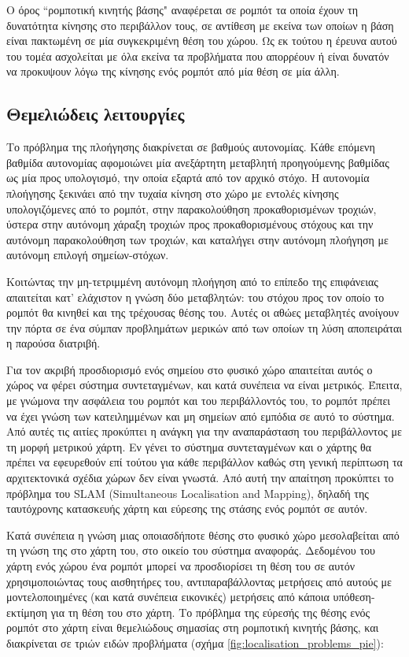 Ο όρος ``ρομποτική κινητής βάσης" αναφέρεται σε ρομπότ τα οποία έχουν τη
δυνατότητα κίνησης στο περιβάλλον τους, σε αντίθεση με εκείνα των οποίων η βάση
είναι πακτωμένη σε μία συγκεκριμένη θέση του χώρου. Ως εκ τούτου η έρευνα αυτού
του τομέα ασχολείται με όλα εκείνα τα προβλήματα που απορρέουν ή είναι δυνατόν
να προκυψουν λόγω της κίνησης ενός ρομπότ από μία θέση σε μία άλλη.


\subsection{Θεμελιώδεις λειτουργίες}
\label{subsec:01_01_01_1}

Το πρόβλημα της πλοήγησης διακρίνεται σε βαθμούς αυτονομίας. Κάθε επόμενη
βαθμίδα αυτονομίας αφομοιώνει μία ανεξάρτητη μεταβλητή προηγούμενης βαθμίδας ως
μία προς υπολογισμό, την οποία εξαρτά από τον αρχικό στόχο. Η αυτονομία
πλοήγησης ξεκινάει από την τυχαία κίνηση στο χώρο με εντολές κίνησης
υπολογιζόμενες από το ρομπότ, στην παρακολούθηση προκαθορισμένων τροχιών,
ύστερα στην αυτόνομη χάραξη τροχιών προς προκαθορισμένους στόχους και την
αυτόνομη παρακολούθηση των τροχιών, και καταλήγει στην αυτόνομη πλοήγηση με
αυτόνομη επιλογή σημείων-στόχων.

Κοιτώντας την μη-τετριμμένη αυτόνομη πλοήγηση από το επίπεδο της επιφάνειας
απαιτείται κατ' ελάχιστον η γνώση δύο μεταβλητών: του στόχου προς τον οποίο το
ρομπότ θα κινηθεί και της τρέχουσας θέσης του. Αυτές οι αθώες μεταβλητές
ανοίγουν την πόρτα σε ένα σύμπαν προβλημάτων μερικών από των οποίων τη λύση
αποπειράται η παρούσα διατριβή.

Για τον ακριβή προσδιορισμό ενός σημείου στο φυσικό χώρο απαιτείται αυτός ο
χώρος να φέρει σύστημα συντεταγμένων, και κατά συνέπεια να είναι μετρικός.
Έπειτα, με γνώμονα την ασφάλεια του ρομπότ και του περιβάλλοντός του, το ρομπότ
πρέπει να έχει γνώση των κατειλημμένων και μη σημείων από εμπόδια σε αυτό το
σύστημα. Από αυτές τις αιτίες προκύπτει η ανάγκη για την αναπαράσταση του
περιβάλλοντος με τη μορφή μετρικού χάρτη. Εν γένει το σύστημα συντεταγμένων και
ο χάρτης θα πρέπει να εφευρεθούν επί τούτου για κάθε περιβάλλον καθώς στη
γενική περίπτωση τα αρχιτεκτονικά σχέδια χώρων δεν είναι γνωστά. Από αυτή την
απαίτηση προκύπτει το πρόβλημα του SLAM (Simultaneous Localisation and
Mapping), δηλαδή της ταυτόχρονης κατασκευής χάρτη και εύρεσης της στάσης ενός
ρομπότ σε αυτόν.

Κατά συνέπεια η γνώση μιας οποιασδήποτε θέσης στο φυσικό χώρο μεσολαβείται από
τη γνώση της στο χάρτη του, στο οικείο του σύστημα αναφοράς. Δεδομένου του
χάρτη ενός χώρου ένα ρομπότ μπορεί να προσδιορίσει τη θέση του σε αυτόν
χρησιμοποιώντας τους αισθητήρες του, αντιπαραβάλλοντας μετρήσεις από αυτούς με
μοντελοποιημένες (και κατά συνέπεια εικονικές) μετρήσεις από κάποια
υπόθεση-εκτίμηση για τη θέση του στο χάρτη. Το πρόβλημα της εύρεσής της θέσης
ενός ρομπότ στο χάρτη είναι θεμελιώδους σημασίας στη ρομποτική κινητής βάσης,
και διακρίνεται σε τριών ειδών προβλήματα (σχήμα
\ref{fig:localisation_problems_pie}):

